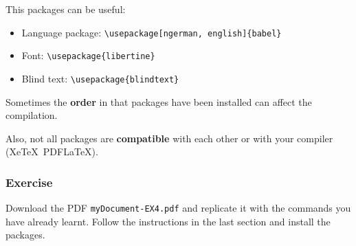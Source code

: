 \begin{frame}[fragile]

This packages can be useful:
\begin{itemize}


\item Language package:  \hfill 
\lstinline|\usepackage[ngerman, english]{babel}|


\item Font:  \hfill 
\lstinline|\usepackage{libertine}|

\item Blind text:  \hfill 
\lstinline|\usepackage{blindtext}|
\end{itemize}

Sometimes the \textbf{order} in that packages have been installed can affect the compilation.

Also, not all packages are \textbf{compatible} with each other or with your compiler (Xe\TeX\ \vs PDF\LaTeX ).

\end{frame}


\begin{frame}[fragile]
\frametitle{Exercise}

Download the PDF \alert{\texttt{myDocument-EX4.pdf}} and replicate it with the commands you have already learnt. Follow the instructions in the last section and install the packages.

\end{frame}


%
%
%


%	
%	
%	
%
%
%
